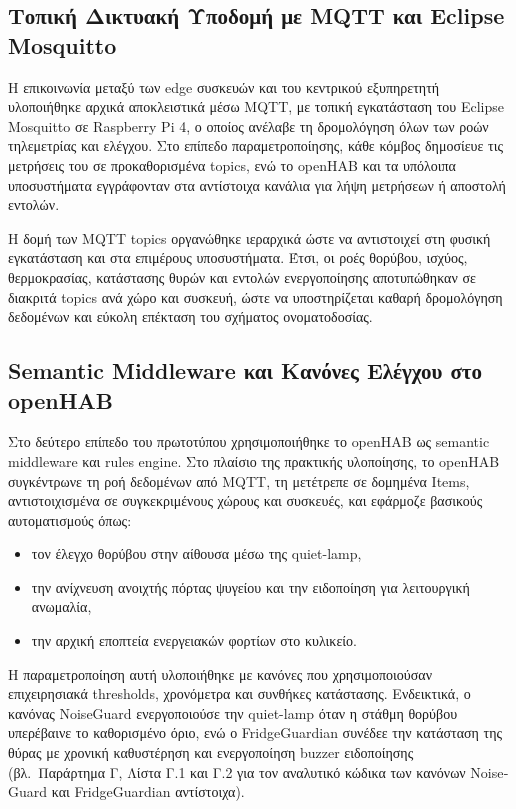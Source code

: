 \subsection{\texorpdfstring{Τοπική Δικτυακή Υποδομή με \textlatin{MQTT} και \textlatin{Eclipse Mosquitto}}{Τοπική Δικτυακή Υποδομή με MQTT και Eclipse Mosquitto}}
Η επικοινωνία μεταξύ των \textlatin{edge} συσκευών και του κεντρικού εξυπηρετητή υλοποιήθηκε αρχικά αποκλειστικά μέσω \textlatin{MQTT}, με τοπική εγκατάσταση του \textlatin{Eclipse Mosquitto} σε \textlatin{Raspberry Pi 4}, ο οποίος ανέλαβε τη δρομολόγηση όλων των ροών τηλεμετρίας και ελέγχου. Στο επίπεδο παραμετροποίησης, κάθε κόμβος δημοσίευε τις μετρήσεις του σε προκαθορισμένα \textlatin{topics}, ενώ το \textlatin{openHAB} και τα υπόλοιπα υποσυστήματα εγγράφονταν στα αντίστοιχα κανάλια για λήψη μετρήσεων ή αποστολή εντολών.

Η δομή των \textlatin{MQTT topics} οργανώθηκε ιεραρχικά ώστε να αντιστοιχεί στη φυσική εγκατάσταση και στα επιμέρους υποσυστήματα. Έτσι, οι ροές θορύβου, ισχύος, θερμοκρασίας, κατάστασης θυρών και εντολών ενεργοποίησης αποτυπώθηκαν σε διακριτά \textlatin{topics} ανά χώρο και συσκευή, ώστε να υποστηρίζεται καθαρή δρομολόγηση δεδομένων και εύκολη επέκταση του σχήματος ονοματοδοσίας.

\subsection{\texorpdfstring{\textlatin{Semantic Middleware} και Κανόνες Ελέγχου στο \textlatin{openHAB}}{Semantic Middleware και Κανόνες Ελέγχου στο openHAB}}
Στο δεύτερο επίπεδο του πρωτοτύπου χρησιμοποιήθηκε το \textlatin{openHAB} ως \textlatin{semantic middleware} και \textlatin{rules engine}. Στο πλαίσιο της πρακτικής υλοποίησης, το \textlatin{openHAB} συγκέντρωνε τη ροή δεδομένων από \textlatin{MQTT}, τη μετέτρεπε σε δομημένα \textlatin{Items}, αντιστοιχισμένα σε συγκεκριμένους χώρους και συσκευές, και εφάρμοζε βασικούς αυτοματισμούς όπως:
\begin{itemize}
  \item τον έλεγχο θορύβου στην αίθουσα μέσω της \textlatin{quiet-lamp},
  \item την ανίχνευση ανοιχτής πόρτας ψυγείου και την ειδοποίηση για λειτουργική ανωμαλία,
  \item την αρχική εποπτεία ενεργειακών φορτίων στο κυλικείο.
\end{itemize}

Η παραμετροποίηση αυτή υλοποιήθηκε με κανόνες που χρησιμοποιούσαν επιχειρησιακά \textlatin{thresholds}, χρονόμετρα και συνθήκες κατάστασης. Ενδεικτικά, ο κανόνας \textlatin{NoiseGuard} ενεργοποιούσε την \textlatin{quiet-lamp} όταν η στάθμη θορύβου υπερέβαινε το καθορισμένο όριο, ενώ ο \textlatin{FridgeGuardian} συνέδεε την κατάσταση της θύρας με χρονική καθυστέρηση και ενεργοποίηση \textlatin{buzzer} ειδοποίησης (βλ.\ Παράρτημα Γ, Λίστα Γ.1 και Γ.2 για τον αναλυτικό κώδικα των κανόνων \textlatin{NoiseGuard} και \textlatin{FridgeGuardian} αντίστοιχα).

